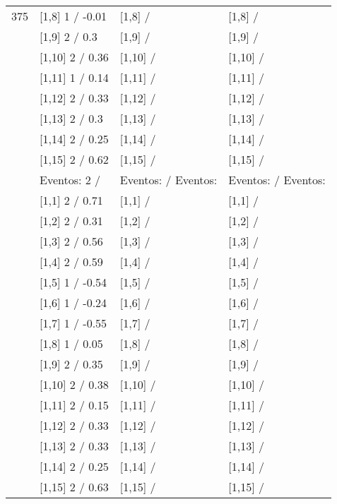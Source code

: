 \begin{table}
\begin{tabular}[t]{llll}
375 & {}[1,8] 1  / -0.01 & {}[1,8]  / & {}[1,8]  /\\
\addlinespace
 & {}[1,9] 2  / 0.3 & {}[1,9]  / & {}[1,9]  /\\
 & {}[1,10] 2  / 0.36 & {}[1,10]  / & {}[1,10]  /\\
 & {}[1,11] 1  / 0.14 & {}[1,11]  / & {}[1,11]  /\\
 & {}[1,12] 2  / 0.33 & {}[1,12]  / & {}[1,12]  /\\
 & {}[1,13] 2  / 0.3 & {}[1,13]  / & {}[1,13]  /\\
\addlinespace
 & {}[1,14] 2  / 0.25 & {}[1,14]  / & {}[1,14]  /\\
 & {}[1,15] 2  / 0.62 & {}[1,15]  / & {}[1,15]  /\\
 & Eventos:  2 / & Eventos:   / Eventos: & Eventos:   / Eventos:\\
 & {}[1,1] 2  / 0.71 & {}[1,1]  / & {}[1,1]  /\\
 & {}[1,2] 2  / 0.31 & {}[1,2]  / & {}[1,2]  /\\
\addlinespace
 & {}[1,3] 2  / 0.56 & {}[1,3]  / & {}[1,3]  /\\
 & {}[1,4] 2  / 0.59 & {}[1,4]  / & {}[1,4]  /\\
 & {}[1,5] 1  / -0.54 & {}[1,5]  / & {}[1,5]  /\\
 & {}[1,6] 1  / -0.24 & {}[1,6]  / & {}[1,6]  /\\
 & {}[1,7] 1  / -0.55 & {}[1,7]  / & {}[1,7]  /\\
\addlinespace
500 & {}[1,8] 1  / 0.05 & {}[1,8]  / & {}[1,8]  /\\
 & {}[1,9] 2  / 0.35 & {}[1,9]  / & {}[1,9]  /\\
 & {}[1,10] 2  / 0.38 & {}[1,10]  / & {}[1,10]  /\\
 & {}[1,11] 2  / 0.15 & {}[1,11]  / & {}[1,11]  /\\
 & {}[1,12] 2  / 0.33 & {}[1,12]  / & {}[1,12]  /\\
\addlinespace
 & {}[1,13] 2  / 0.33 & {}[1,13]  / & {}[1,13]  /\\
 & {}[1,14] 2  / 0.25 & {}[1,14]  / & {}[1,14]  /\\
 & {}[1,15] 2  / 0.63 & {}[1,15]  / & {}[1,15]  /\\
\bottomrule
\end{tabular}
\end{table}
